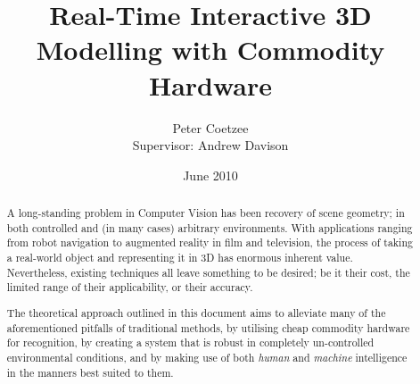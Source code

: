 \documentclass[a4paper,10pt]{article}
\title{Real-Time Interactive 3D Modelling with Commodity Hardware
\vspace{30pt}}
\author{Peter Coetzee\\Supervisor: Andrew Davison
\vspace{30pt}}
\date{June 2010}
\begin{document}
\maketitle

\vspace{40pt}

\begin{abstract}
A long-standing problem in Computer Vision has been recovery of scene geometry; in both controlled and (in many cases) arbitrary environments. With applications ranging from robot navigation to augmented reality in film and television, the process of taking a real-world object and representing it in 3D has enormous inherent value. Nevertheless, existing techniques all leave something to be desired; be it their cost, the limited range of their applicability, or their accuracy.

The theoretical approach outlined in this document aims to alleviate many of the aforementioned pitfalls of traditional methods, by utilising cheap commodity hardware for recognition, by creating a system that is robust in completely un-controlled environmental conditions, and by making use of both \textit{human} and \textit{machine} intelligence in the manners best suited to them.
\end{abstract}

\vspace{30pt}

\makeatletter
\newcommand\ackname{Acknowledgements}
\if@titlepage
  \newenvironment{acknowledgements}{%
      \titlepage
      \null\vfil
      \@beginparpenalty\@lowpenalty
      \begin{center}%
        \bfseries \ackname
        \@endparpenalty\@M
      \end{center}}%
     {\par\vfil\null\endtitlepage}
\else
  \newenvironment{acknowledgements}{%
      \if@twocolumn
        \section*{\abstractname}%
      \else
        \small
        \begin{center}%
          {\bfseries \ackname\vspace{-.5em}\vspace{\z@}}%
        \end{center}%
        \quotation
      \fi}
      {\if@twocolumn\else\endquotation\fi}
\fi
\makeatother
\end{document}
